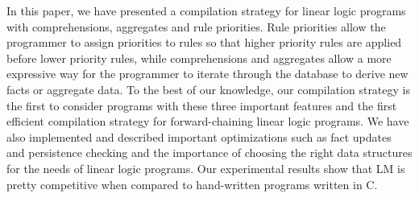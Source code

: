 In this paper, we have presented a compilation strategy for linear logic
programs with comprehensions, aggregates and rule priorities. Rule priorities
allow the programmer to assign priorities to rules so that higher priority rules
are applied before lower priority rules, while comprehensions and aggregates
allow a more expressive way for the programmer to iterate through the database
to derive new facts or aggregate data. To the best of our knowledge, our
compilation strategy is the first to consider programs with these three
important features and the first efficient compilation strategy for
forward-chaining linear logic programs.  We have also implemented and described
important optimizations such as fact updates and persistence checking and the
importance of choosing the right data structures for the needs of linear logic
programs.  Our experimental results show that LM is pretty competitive when
compared to hand-written programs written in C.
